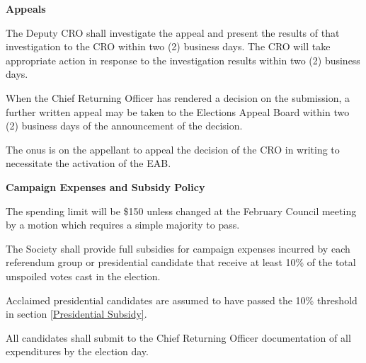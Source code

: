 \begin{longenum}[ label*=\thesection.\arabic*., align=left]
 \item \textbf{Appeals}
 \begin{longenum}[label*=\arabic*., align=left]
 \item The Deputy CRO shall investigate the appeal and present the results of that investigation to the CRO within  two (2) business days. The CRO will  take appropriate action in response  to  the investigation results within two (2) business days.
\item  When  the  Chief  Returning  Officer  has  rendered  a  decision  on  the  submission,  a  further  written appeal may be taken to the Elections Appeal Board within two (2) business days of the announcement of the decision.
\item The onus is on the appellant to appeal the decision of the CRO in writing to necessitate the activation of the EAB.
  \end{longenum}
  \item \textbf{Campaign Expenses and Subsidy Policy}	
  \begin{longenum}[label*=\arabic*., align=left]
  \item The spending limit will be \$150 unless changed at the February Council meeting by a motion which requires a simple majority to pass.
\item \label{Presidential Subsidy}The Society shall provide full subsidies for campaign expenses incurred by each referendum group or presidential candidate that receive at least 10\% of the total unspoiled votes cast in the election.  
			\begin{longenum}[label*=\arabic*., align=left]
			\item  Acclaimed  presidential  candidates  are  assumed  to  have  passed  the  10\%  threshold  in section \ref{Presidential Subsidy}.
			\end{longenum}
\item All candidates shall submit to the Chief Returning Officer documentation of all expenditures by the election day.
 \end{longenum}
\end{longenum}
